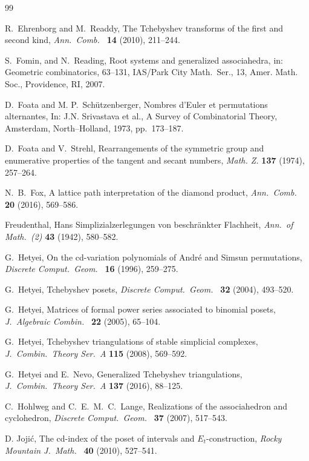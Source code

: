 \documentclass[reqno,12pt]{amsart}
\numberwithin{equation}{section}
\newcommand{\0}{\widehat{0}}
\newcommand{\1}{\widehat{1}}
\newcommand{\2}{\widehat{2}}
\begin{document}
\begin{thebibliography}{99}
 
  R.\ Ehrenborg and M.\ Readdy,
The Tchebyshev transforms of the first and second kind,
{\it Ann.\ Comb.\ } {\bf 14} (2010), 211--244.   

S.\ Fomin, and N.\ Reading, 
Root systems and generalized associahedra, in: Geometric combinatorics, 63--131,
IAS/Park City Math.\ Ser., 13, Amer. Math. Soc., Providence, RI, 2007.   

 D.\ Foata and M. P.\ Sch\"{u}tzenberger,
  Nombres d'Euler et permutations alternantes,
In: J.N. Srivastava et al.,
A Survey of Combinatorial Theory, Amsterdam, North--Holland,
1973, pp.\ 173--187.

 D.\ Foata and V.\ Strehl, Rearrangements of the
symmetric group and enumerative properties of the tangent and secant
numbers, {\it Math. Z.} {\bf 137} (1974), 257--264.

N.\ B.\ Fox, 
A lattice path interpretation of the diamond product,
{\it Ann.\ Comb.\ } {\bf 20} (2016), 569--586.   

Freudenthal, Hans
Simplizialzerlegungen von beschr\"ankter Flachheit,
{\it Ann.\ of Math.\  (2)} {\bf 43} (1942), 580--582.   

G.\ Hetyei,
On the cd-variation polynomials of Andr\'e and Simsun permutations,
{\it Discrete Comput.\ Geom.\ } {\bf 16} (1996), 259--275. 
  
  G.\ Hetyei,
Tchebyshev posets,
{\it Discrete Comput.\ Geom.\ } {\bf 32} (2004), 493--520.   

G.\ Hetyei,
Matrices of formal power series associated to binomial posets,
{\it J.\ Algebraic Combin.\ } {\bf 22} (2005), 65--104.   

  G.\ Hetyei,
Tchebyshev triangulations of stable simplicial complexes,
{\it J.\ Combin.\ Theory Ser.\ A} {\bf 115} (2008), 569--592.   

  G.\ Hetyei and E.\ Nevo,
Generalized Tchebyshev triangulations,
{\it J.\ Combin.\ Theory Ser.\ A} {\bf 137} (2016), 88--125.   

C.\ Hohlweg and C.~E.~M.~C.~Lange, 
Realizations of the associahedron and cyclohedron,
{\it Discrete Comput.\ Geom.\ } {\bf 37 }(2007), 517--543.   

D. Joji\'{c}, 
The cd-index of the poset of intervals and $E_t$-construction,
{\it Rocky Mountain J.\ Math.\ } {\bf 40} (2010), 527--541.   



\end{thebibliography}
\end{document}
